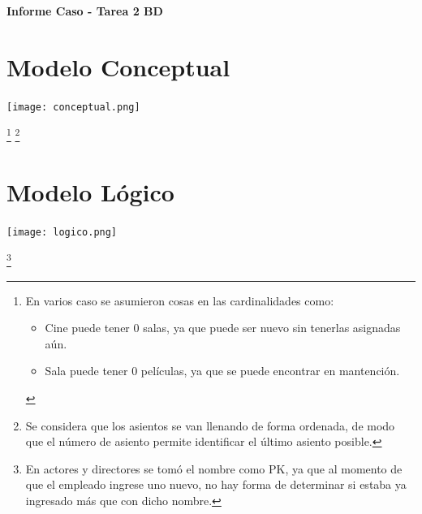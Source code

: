 \documentclass[11pt,letterpaper]{article}
\newcommand{\titulo}{Informe Caso - Tarea 2 BD}
\renewcommand{\maketitle}
{
\thispagestyle{fancy}
\begin{center}
\begin{Large}
\textbf{\titulo}\\
\end{Large}
\end{center}
\vspace{0.3cm}
}
\begin{document}
\maketitle
\section{Modelo Conceptual}
\vspace{0.6cm}
\begin{center}
	\texttt{[image: conceptual.png]}
\end{center}
\let\thefootnote\relax\footnote{En varios caso se asumieron cosas en las cardinalidades como:
	\begin{itemize}
		\item Cine puede tener 0 salas, ya que puede ser nuevo sin tenerlas asignadas aún.
		\item Sala puede tener 0 películas, ya que se puede encontrar en mantención.
	\end{itemize}
}
\footnote{Se considera que los asientos se van llenando de forma ordenada, de modo que el número de asiento permite identificar el último asiento posible.}

\newpage
\section{Modelo Lógico}
\vspace{0.6cm}
\begin{center}
	\texttt{[image: logico.png]}
\end{center}
\footnote{En actores y directores se tomó el nombre como PK, ya que al momento de que el empleado ingrese uno nuevo, no hay forma de determinar si estaba ya ingresado más que con dicho nombre.}
\end{document}
